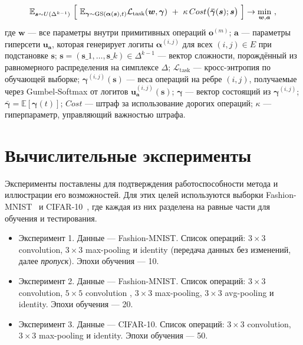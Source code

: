 \documentclass{article}
\begin{document}
$$
\mathbb E_{\boldsymbol s\sim U(\Delta^{k-1})} \ \Bigl[ \ {\mathbb E_{\boldsymbol\gamma\sim\mathrm{GS}(\boldsymbol\alpha(\boldsymbol s),t)} \mathcal L_{\text{task}}(\boldsymbol w,\boldsymbol\gamma)} \ +\  \kappa\,Cost\bigl(\boldsymbol{\bar\gamma}(\boldsymbol s);\boldsymbol s\bigr) \ \Bigr] \rightarrow \min_{\boldsymbol w,\boldsymbol a} \ , 
$$
где $\boldsymbol w$ --- все параметры внутри примитивных операций $\mathbf{o}^{(m)}$;
$\boldsymbol a$ --- параметры гиперсети $\boldsymbol{u}_{\boldsymbol a}$, которая генерирует логиты $\boldsymbol\alpha^{(i,j)}$ для всех $(i,j)\in E$ при подстановке $\boldsymbol{s}$;
$\boldsymbol{s} = (\boldsymbol{s}\_1,\dots,\boldsymbol{s}\_k)\in\Delta^{k-1}$ --- вектор сложности, порождённый из равномерного распределения на симплексе $\Delta$;
$\mathcal L_{\text{task}}$ --- кросс-энтропия по обучающей выборке;
$\boldsymbol\gamma^{(i,j)}(\boldsymbol{s})$ --- веса операций на ребре $(i,j)$, получаемые через Gumbel‐Softmax от логитов $\boldsymbol{u}_{\boldsymbol a}^{(i,j)}(\boldsymbol{s})$; 
$\boldsymbol\gamma$ --- вектор состоящий из $\boldsymbol\gamma^{(i,j)}$;
$\boldsymbol{\bar\gamma} = \mathbb E[\boldsymbol{\gamma}(t)]$; 
$Cost$ --- штраф за использование дорогих операций;
$\kappa$ --- гиперпараметр, управляющий важностью штрафа.


\section{Вычислительные эксперименты}

Эксперименты поставлены для подтверждения работоспособности метода и иллюстрации его возможностей. Для этих целей используются выборки Fashion-MNIST~\cite{fashion_mnist} и CIFAR-10~\cite{cifar10}, где каждая из них разделена на равные части для обучения и тестирования. 

\begin{itemize}
    \item Эксперимент 1. Данные --- Fashion-MNIST. Список операций: \(3{\times}3\) convolution, \(3{\times}3\) max-pooling и identity (передача данных без изменений, далее \textit{пропуск}). Эпохи обучения --- 10.
    \item Эксперимент 2. Данные --- Fashion-MNIST.  Список операций: \(3{\times}3\) convolution, \(5{\times}5\) convolution , \(3{\times}3\) max-pooling, \(3{\times}3\) avg-pooling и identity. Эпохи обучения --- 20.
    \item Эксперимент 3. Данные --- CIFAR-10. Список операций: \(3{\times}3\) convolution, \(3{\times}3\) max-pooling и identity. Эпохи обучения --- 50.
    
\end{itemize}
\end{document}
